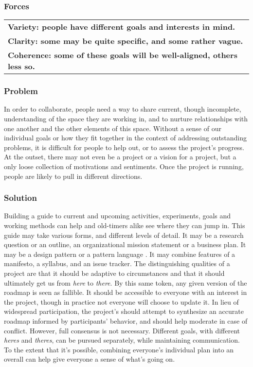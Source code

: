 \subsubsection*{Forces}
\raisebox{-1\baselineskip}
{{\centering
\begin{tabular}{l}
\textbf{Variety: people have different goals and interests in mind.}\\
\textbf{Clarity: some may be quite specific, and some rather vague.}\\
\textbf{Coherence: some of these goals will be well-aligned, others less so.}
\end{tabular}
}}

\subsubsection*{Problem} In order to collaborate, people need a way to share current, though incomplete, understanding of the space they are working in, and to nurture relationships with one another and the other elements of this space.  Without a sense of our individual goals or how they fit together in the context of addressing outstanding problems, it is difficult for people to help out, or to assess the 
project's progress.  At the outset, there may not even be a project or a vision for a project, but a only loose collection of motivations and sentiments.  Once the project is running, people are likely to pull in different directions.   

\subsubsection*{Solution} Building a guide to current and upcoming activities, experiments, goals and working methods can help  and old-timers alike see where they can jump in.  This guide may take various forms, and different levels of detail.  It may be a research question or an outline, an organizational mission statement or a business plan.  It may be a design pattern or a pattern language \cite{kohls2010structure}.  It may combine features of a manifesto, a syllabus, and an issue tracker.  The distinguishing qualities of a project  are that it should be adaptive to circumstances and that it should ultimately get us from \emph{here} to \emph{there}.  By this same token, any given version of the roadmap is seen as fallible.  It should be accessible to everyone with an interest in the project, though in practice not everyone will choose to update it.  In lieu of widespread participation, the project's  should attempt to synthesize an accurate roadmap informed by participants' behavior, and should help moderate in case of conflict.  However, full consensus is not necessary.  Different goals, with different \emph{heres} and \emph{theres}, can be pursued separately, while maintaining communication.  To the extent that it's possible, combining everyone's individual plan into an overall  can help give everyone a sense of what's going on.

